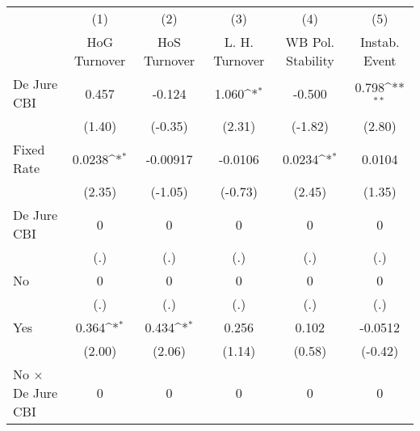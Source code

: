 \begin{table}[htbp]\centering
\def\sym#1{\ifmmode^{#1}\else\(^{#1}\)\fi}
\caption{\label{ifullicmultIndFEDJ}}
\begin{tabular}{l*{5}{c}}
\toprule
                                        &\multicolumn{1}{c}{(1)}&\multicolumn{1}{c}{(2)}&\multicolumn{1}{c}{(3)}&\multicolumn{1}{c}{(4)}&\multicolumn{1}{c}{(5)}\\
                                        &\multicolumn{1}{c}{HoG Turnover}&\multicolumn{1}{c}{HoS Turnover}&\multicolumn{1}{c}{L. H. Turnover}&\multicolumn{1}{c}{WB Pol. Stability}&\multicolumn{1}{c}{Instab. Event}\\
\midrule
De Jure CBI                             &    0.457         &   -0.124         &    1.060\sym{*}  &   -0.500         &    0.798\sym{**} \\
                                        &   (1.40)         &  (-0.35)         &   (2.31)         &  (-1.82)         &   (2.80)         \\
\addlinespace
Fixed Rate                              &   0.0238\sym{*}  & -0.00917         &  -0.0106         &   0.0234\sym{*}  &   0.0104         \\
                                        &   (2.35)         &  (-1.05)         &  (-0.73)         &   (2.45)         &   (1.35)         \\
\addlinespace
De Jure CBI                             &        0         &        0         &        0         &        0         &        0         \\
                                        &      (.)         &      (.)         &      (.)         &      (.)         &      (.)         \\
\addlinespace
No                                      &        0         &        0         &        0         &        0         &        0         \\
                                        &      (.)         &      (.)         &      (.)         &      (.)         &      (.)         \\
\addlinespace
Yes                                     &    0.364\sym{*}  &    0.434\sym{*}  &    0.256         &    0.102         &  -0.0512         \\
                                        &   (2.00)         &   (2.06)         &   (1.14)         &   (0.58)         &  (-0.42)         \\
\addlinespace
No $\times$ De Jure CBI                 &        0         &        0         &        0         &        0         &        0         \\

\end{tabular}
\end{table}
